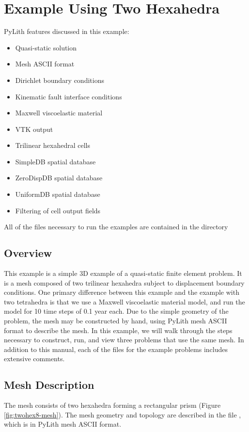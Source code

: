 \section{Example Using Two Hexahedra}
\label{sec:example:twohex8}

PyLith features discussed in this example:
\begin{itemize}
\item Quasi-static solution
\item Mesh ASCII format
\item Dirichlet boundary conditions
\item Kinematic fault interface conditions
\item Maxwell viscoelastic material
\item VTK output
\item Trilinear hexahedral cells
\item SimpleDB spatial database
\item ZeroDispDB spatial database
\item UniformDB spatial database
\item Filtering of cell output fields
\end{itemize}
All of the files necessary to run the examples are contained in the
directory 


\subsection{Overview}

This example is a simple 3D example of a quasi-static finite element
problem. It is a mesh composed of two trilinear hexahedra subject
to displacement boundary conditions. One primary difference between
this example and the example with two tetrahedra is that we use a
Maxwell viscoelastic material model, and run the model for 10 time
steps of 0.1 year each. Due to the simple geometry of the problem,
the mesh may be constructed by hand, using PyLith mesh ASCII format
to describe the mesh. In this example, we will walk through the steps
necessary to construct, run, and view three problems that use the
same mesh. In addition to this manual, each of the files for the example
problems includes extensive comments.


\subsection{Mesh Description}

The mesh consists of two hexahedra forming a rectangular prism (Figure
\vref{fig:twohex8-mesh}). The mesh geometry and topology are described
in the file , which is in PyLith mesh ASCII format.

